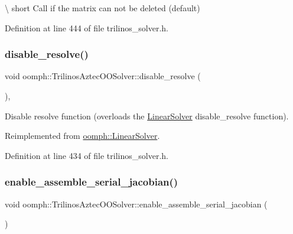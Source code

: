 \textbackslash{} short Call if the matrix can not be deleted (default) 



Definition at line 444 of file trilinos\+\_\+solver.\+h.

\mbox{\label{classoomph_1_1TrilinosAztecOOSolver_a7d9c9d9beddb2d18abea55529db534e4}} 
\subsubsection{\texorpdfstring{disable\+\_\+resolve()}{disable\_resolve()}}
{\footnotesize\ttfamily void oomph\+::\+Trilinos\+Aztec\+O\+O\+Solver\+::disable\+\_\+resolve (\begin{DoxyParamCaption}{ }\end{DoxyParamCaption})\hspace{0.3cm}{\ttfamily [inline]}, {\ttfamily [virtual]}}



Disable resolve function (overloads the \hyperlink{classoomph_1_1LinearSolver}{Linear\+Solver} disable\+\_\+resolve function). 



Reimplemented from \hyperlink{classoomph_1_1LinearSolver_ad61c63af94c5961830bd9807225a48d6}{oomph\+::\+Linear\+Solver}.



Definition at line 434 of file trilinos\+\_\+solver.\+h.

\mbox{\label{classoomph_1_1TrilinosAztecOOSolver_a80de34d99eff7b2ad41af3e04229a55b}} 
\subsubsection{\texorpdfstring{enable\+\_\+assemble\+\_\+serial\+\_\+jacobian()}{enable\_assemble\_serial\_jacobian()}}
{\footnotesize\ttfamily void oomph\+::\+Trilinos\+Aztec\+O\+O\+Solver\+::enable\+\_\+assemble\+\_\+serial\+\_\+jacobian (\begin{DoxyParamCaption}{ }\end{DoxyParamCaption})\hspace{0.3cm}{\ttfamily [inline]}}



